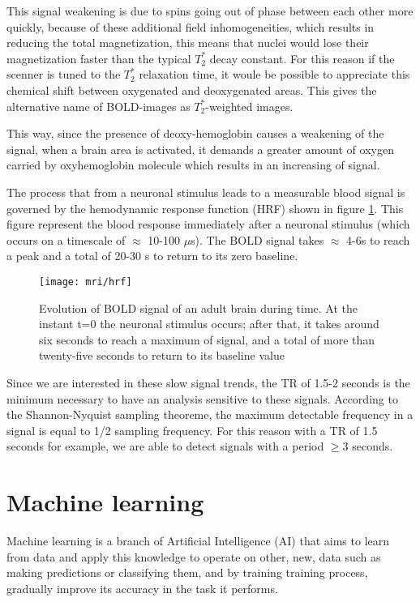 \documentclass[10pt]{report}
\begin{document}
This signal weakening is due to spins going out of phase between each other more quickly, because of these additional field inhomogeneities, which results in reducing the total magnetization, this means that nuclei would lose their magnetization faster than the typical $T_2^*$ decay constant.
For this reason if the scenner is tuned to the $T_2^*$ relaxation time, it woule be possible to appreciate this chemical shift between oxygenated and deoxygenated areas. This gives the alternative name of BOLD-images as $T_2^{\ast}$-weighted images. \cite{huettel-2009}

This way, since the presence of deoxy-hemoglobin causes a weakening of the signal, when a brain area is activated, it demands a greater amount of oxygen carried by oxyhemoglobin molecule which results in an increasing of signal.

The process that from a neuronal stimulus leads to a measurable blood signal is governed by the hemodynamic response function (HRF) shown in figure \ref{fig:hrf}. This figure represent the blood response immediately after a neuronal stimulus (which occurs on a timescale of $\approx$ 10-100 $\mu$s). The BOLD signal takes $\approx$ 4-6s to reach a peak and a total of 20-30 s to return to its zero baseline.

\begin{figure}[h]
\centering
\texttt{[image: mri/hrf]}
\caption{Evolution of BOLD signal of an adult brain during time. At the instant t=0 the neuronal stimulus occurs; after that, it takes around six seconds to reach a maximum of signal, and a total of more than twenty-five seconds to return to its baseline value}
\label{fig:hrf}
\end{figure}


Since we are interested in these slow signal trends, the TR of 1.5-2 seconds is the minimum necessary to have an analysis sensitive to these signals.
According to the Shannon-Nyquist sampling theoreme, the maximum detectable frequency in a signal is equal to 1/2 sampling frequency. For this reason with a TR of 1.5 seconds for example, we are able to detect signals with a period $\geq 3$ seconds.




\chapter{Machine learning}

Machine learning is a branch of Artificial Intelligence (AI) that aims to learn from data and apply this knowledge to operate on other, new, data such as making predictions or classifying them, and by training training process, gradually improve its accuracy in the task it performs.
\end{document}
